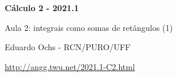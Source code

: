 \documentclass[oneside,12pt]{article}
\begin{document}


\long{}
\long{}
\long{}
\long{}
\long{}
\long{}
\long{}
\long{}
\long{}
\long{}
\long{}

\long{}
\long{}

\def\frown{\ensuremath{{=}{(}}}
\def\True {\mathbf{V}}
\def\False{\mathbf{F}}
\def\D    {\displaystyle}

\def\drafturl{http://angg.twu.net/LATEX/2021-1-C2.pdf}
\def\drafturl{http://angg.twu.net/2021.1-C2.html}
\def\draftfooter{\tiny \href{\drafturl}{\jobname{}} \ColorBrown{\shorttoday{} \hours}}



%

\thispagestyle{empty}

\begin{center}

\vspace*{1.2cm}

{\bf \Large Cálculo 2 - 2021.1}

\bsk

Aula 2: integrais como somas de retângulos (1)

\bsk

Eduardo Ochs - RCN/PURO/UFF

\url{http://angg.twu.net/2021.1-C2.html}

\end{center}
\end{document}
